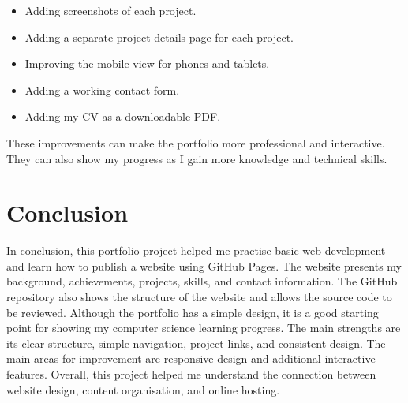 \documentclass[12pt,a4paper]{article}
\begin{document}
\begin{itemize}
\item Adding screenshots of each project.
\item Adding a separate project details page for each project.
\item Improving the mobile view for phones and tablets.
\item Adding a working contact form.
\item Adding my CV as a downloadable PDF.
\end{itemize}

These improvements can make the portfolio more professional and interactive. They can also show my progress as I gain more knowledge and technical skills.

\section{Conclusion}

In conclusion, this portfolio project helped me practise basic web development and learn how to publish a website using GitHub Pages.
The website presents my background, achievements, projects, skills, and contact information. The GitHub repository also shows the structure of the website and allows the source code to be reviewed.
Although the portfolio has a simple design, it is a good starting point for showing my computer science learning progress. The main strengths are its clear structure, simple navigation, project links, and consistent design.
The main areas for improvement are responsive design and additional interactive features. Overall, this project helped me understand the connection between website design, content organisation, and online hosting.
\end{document}
